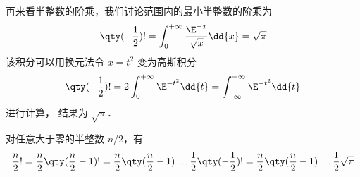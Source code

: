 再来看半整数的阶乘，我们讨论范围内的最小半整数的阶乘为 
\begin{equation}
\qty(-\frac12) ! = \int_0^{+\infty} \frac{\E^{-x}}{\sqrt x}\dd{x} = \sqrt{\pi}
\end{equation}
该积分可以用换元法令 $x = t^2$ 变为高斯积分
\begin{equation}
\qty(-\frac 12)! = 2\int_0^{+\infty} \E^{-t^2} \dd{t} = \int_{-\infty}^{+\infty} \E^{-t^2} \dd{t}
\end{equation}
进行计算， 结果为 $\sqrt{\pi}$．

对任意大于零的半整数 $n/2$，有
\begin{equation}
\frac{n}{2}! = \frac{n}{2} \qty(\frac{n}{2}-1)! = \frac{n}{2} \qty(\frac{n}{2}-1) \dots \frac12 \qty(-\frac12) ! = \frac{n}{2} \qty(\frac{n}{2}-1) \dots \frac12 \sqrt{\pi}
\end{equation}














